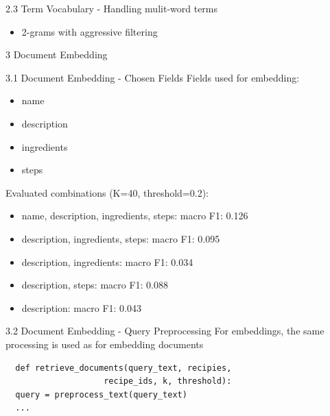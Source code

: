\documentclass{beamer}
\begin{document}
\begin{frame}{2.3 Term Vocabulary - Handling mulit-word terms}
  \begin{itemize}
    \item 2-grams with aggressive filtering
  \end{itemize}
\end{frame}

\begin{frame}{3 Document Embedding}
\end{frame}

\begin{frame}{3.1 Document Embedding - Chosen Fields}
  Fields used for embedding:
  \begin{itemize}
    \item name
    \item description
    \item ingredients
    \item steps
  \end{itemize}

  Evaluated combinations (K=40, threshold=0.2):
  \begin{itemize}
    \item name, description, ingredients, steps: macro F1: 0.126
    \item description, ingredients, steps: macro F1: 0.095
    \item description, ingredients: macro F1: 0.034
    \item description, steps: macro F1: 0.088
    \item description: macro F1: 0.043
  \end{itemize}

\end{frame}

\begin{frame}[fragile]{3.2 Document Embedding - Query Preprocessing}
  For embeddings, the same processing is used as for embedding documents
  \begin{verbatim}
  def retrieve_documents(query_text, recipies,
                    recipe_ids, k, threshold):
  query = preprocess_text(query_text)
  ...
    \end{verbatim}
\end{frame}
\end{document}
